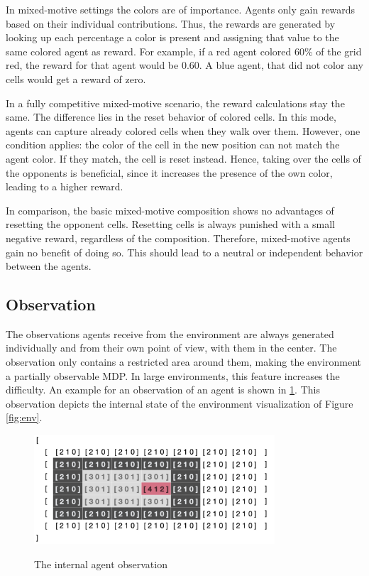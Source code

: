 In mixed-motive settings the colors are of importance. Agents only gain rewards based on their individual contributions. Thus, the rewards are generated by looking up each percentage a color is present and assigning that value to the same colored agent as reward. For example, if a red agent colored 60\% of the grid red, the reward for that agent would be 0.60. A blue agent, that did not color any cells would get a reward of zero.

In a fully competitive mixed-motive scenario, the reward calculations stay the same. The difference lies in the reset behavior of colored cells. In this mode, agents can capture already colored cells when they walk over them. However, one condition applies: the color of the cell in the new position can not match the agent color. If they match, the cell is reset instead. Hence, taking over the cells of the opponents is beneficial, since it increases the presence of the own color, leading to a higher reward.

In comparison, the basic mixed-motive composition shows no advantages of resetting the opponent cells. Resetting cells is always punished with a small negative reward, regardless of the composition. Therefore, mixed-motive agents gain no benefit of doing so. This should lead to a neutral or independent behavior between the agents.

\subsection{Observation}
The observations agents receive from the environment are always generated individually and from their own point of view, with them in the center. The observation only contains a restricted area around them, making the environment a partially observable MDP. In large environments, this feature increases the difficulty. An example for an observation of an agent is shown in \ref{fig:agent_obs}. This observation depicts the internal state of the environment visualization of Figure \ref{fig:env}.

\begin{figure}[hpbt]
    \centering
    \includegraphics[width=0.8\textwidth]{pictures/agent_observation}\\
    \caption[Agent Observation]{The internal agent observation}\label{fig:agent_obs}
\end{figure}

